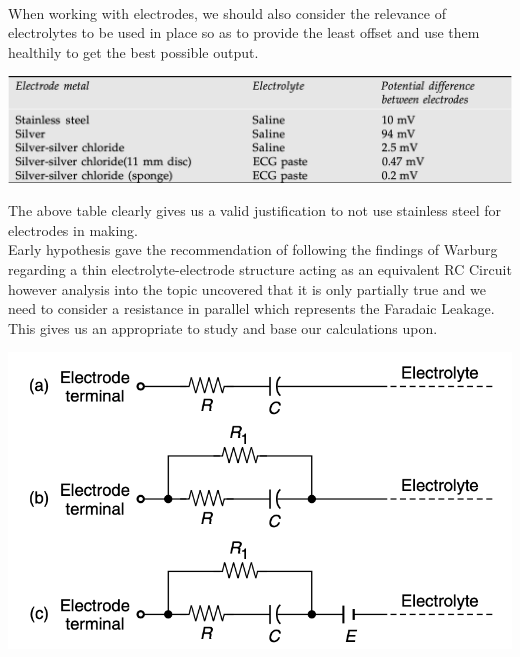 \documentclass{article}
\begin{document}
\\
When working with electrodes, we should also consider the relevance of electrolytes to be used in place so as to provide the least offset and use them healthily to get the best possible output.
\begin{center}
    \includegraphics[scale=0.5]{Screenshot 2023-04-30 at 7.27.45 PM.png}
\end{center}
The above table clearly gives us a valid justification to not use stainless steel for electrodes in making.\\
Early hypothesis gave the recommendation of following the findings of Warburg regarding a thin electrolyte-electrode structure acting as an equivalent RC Circuit however analysis into the topic uncovered that it is only partially true and we need to consider a resistance in parallel which represents the Faradaic Leakage. This gives us an appropriate to study and base our calculations upon.
\begin{center}
    \includegraphics[scale = 0.5]{Screenshot 2023-04-30 at 7.38.55 PM.png}
\end{center}
\end{document}
